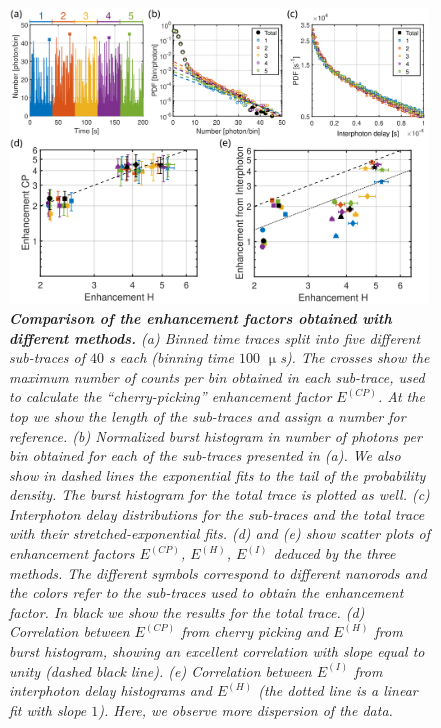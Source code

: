    

\begin{figure}
\includegraphics[width=0.99\textwidth]{06_Figure_6_enhancement_correlation}%
\caption{\textit{\textbf{Comparison of the enhancement factors obtained with different methods.} 
(a) Binned time traces split into five different sub-traces of $40$ s each (binning time $100$ $\upmu$s). 
The crosses show the maximum number of counts per bin obtained in each sub-trace, 
used to calculate the ``cherry-picking'' enhancement factor $E^{(CP)}$. At the top we show the 
length of the sub-traces and assign a number for reference.
(b) Normalized burst histogram in number of photons per bin obtained for each of the sub-traces presented in (a).  
We also show in dashed lines the exponential fits to the tail of the probability density. The burst histogram for the total trace is plotted as well.
(c) Interphoton delay distributions for the sub-traces and the total trace with their stretched-exponential fits. 
(d) and (e) show scatter plots of enhancement factors $E^{(CP)}$, $E^{(H)}$, $E^{(I)}$ deduced by the three methods. The different
symbols correspond to different nanorods and the colors refer to the sub-traces used to obtain the enhancement factor.
In black we show the results for the total trace. 
(d) Correlation between $E^{(CP)}$ from cherry picking and $E^{(H)}$ from burst histogram, showing an excellent correlation with slope equal to unity (dashed black line).
(e) Correlation between $E^{(I)}$ from interphoton delay histograms and $E^{(H)}$ (the dotted line is a linear fit with
slope $1$). Here, we observe more dispersion of the data.
}
\label{fg:en_cor}}
\end{figure}

